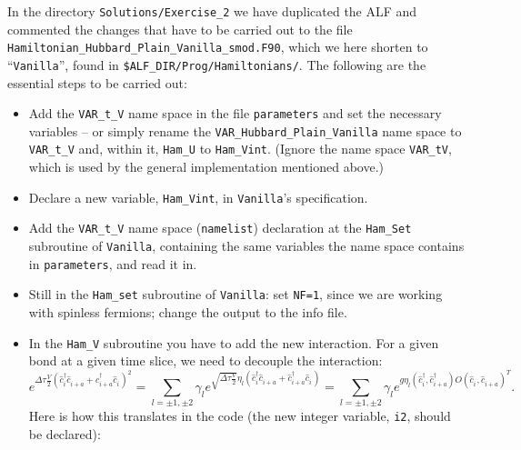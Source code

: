 \documentclass[10pt,modern]{scrartcl}
\numberwithin{exerciseitem}{exercise} %
\begin{document}
In the directory  \texttt{Solutions/Exercise\_2} we have  duplicated the ALF and commented  the changes that have to be carried out to the file \texttt{Hamiltonian\_Hubbard\_Plain\_Vanilla\_smod.F90}, which we here shorten to ``\texttt{Vanilla}'', found in \texttt{\$ALF\_DIR/Prog/Hamiltonians/}. The following are the essential steps to be carried out:
\begin{itemize}
\item  Add the \texttt{VAR\_t\_V} name space in the file \texttt{parameters} and set the necessary variables -- or simply rename the \texttt{VAR\_Hubbard\_Plain\_Vanilla} name space to \texttt{VAR\_t\_V} and, within it, \texttt{Ham\_U} to \texttt{Ham\_Vint}. (Ignore the name space \texttt{VAR\_tV}, which is used by the general implementation mentioned above.)
\item  Declare a new variable, \texttt{Ham\_Vint}, in \texttt{Vanilla}'s specification.
\item Add the \texttt{VAR\_t\_V} name space (\texttt{namelist}) declaration at the \texttt{Ham\_Set} subroutine of \texttt{Vanilla}, containing the same variables the name space contains in \texttt{parameters}, and read it in.
\item  Still in the  \texttt{Ham\_set} subroutine of \texttt{Vanilla}: set \texttt{NF=1}, since we are working with spinless fermions; change the
output to the info file.
\item  In the \texttt{Ham\_V} subroutine you have to add the new interaction. For a given bond at a given time slice, we need to decouple the interaction: 
\begin{equation}
e^{\Delta \tau \frac{V}{2} \left( \hat{c}^{\dagger}_{i}  \hat{c}^{\phantom\dagger}_{i+a}      + \hat{c}^{\dagger}_{i+a}  \hat{c}^{\phantom\dagger}_{i} \right)^2} = 
\sum_{l= \pm1, \pm 2} \gamma_l e^{ \sqrt{\Delta \tau \frac{V}{2}}  \eta_l   \left( \hat{c}^{\dagger}_{i}  \hat{c}^{\phantom\dagger}_{i+a}      + \hat{c}^{\dagger}_{i+a}  \hat{c}^{\phantom\dagger}_{i} \right) } =  \sum_{l= \pm1, \pm 2} \gamma_l e^{ g  \eta_l   \left( \hat{c}^{\dagger}_{i},  \hat{c}^{\dagger}_{i+a}  \right)  O 
    \left(\hat{c}^{\phantom\dagger}_{i},  \hat{c}^{\phantom\dagger}_{i+a} \right)^{T} }.
\end{equation}
 Here is  how this translates in the code (the new integer variable, \texttt{i2}, should be declared): 
 

\end{itemize}
\end{document}
